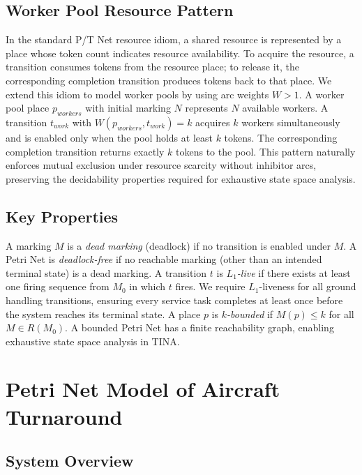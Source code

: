 \documentclass[conference]{IEEEtran}
\begin{document}
\subsection{Worker Pool Resource Pattern}

In the standard P/T Net resource idiom, a shared resource is represented by a
place whose token count indicates resource availability. To acquire the resource,
a transition consumes tokens from the resource place; to release it, the
corresponding completion transition produces tokens back to that place. We extend
this idiom to model worker pools by using arc weights $W > 1$. A worker pool
place $p_{\mathit{workers}}$ with initial marking $N$ represents $N$ available
workers. A transition $t_{\mathit{work}}$ with $W(p_{\mathit{workers}},
t_{\mathit{work}}) = k$ acquires $k$ workers simultaneously and is enabled only
when the pool holds at least $k$ tokens. The corresponding completion transition
returns exactly $k$ tokens to the pool. This pattern naturally enforces mutual
exclusion under resource scarcity without inhibitor arcs, preserving the
decidability properties required for exhaustive state space analysis.

\subsection{Key Properties}

A marking $M$ is a \textit{dead marking} (deadlock) if no transition is enabled
under $M$. A Petri Net is \textit{deadlock-free} if no reachable marking (other
than an intended terminal state) is a dead marking. A transition $t$ is \textit{$L_1$-live} if there exists at least one firing
sequence from $M_0$ in which $t$ fires. We require $L_1$-liveness for all
ground handling transitions, ensuring every service task completes at least
once before the system reaches its terminal state. A place $p$ is \textit{$k$-bounded} if $M(p) \leq k$ for all
$M \in R(M_0)$. A bounded Petri Net has a finite reachability graph, enabling
exhaustive state space analysis in TINA.


\section{Petri Net Model of Aircraft Turnaround}

\subsection{System Overview}
\end{document}
